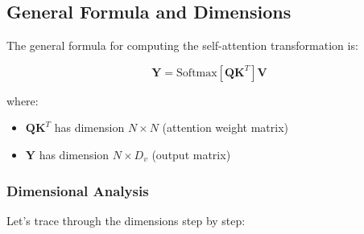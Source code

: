 \documentclass[11pt,a4paper]{article}
\theoremstyle{definition}
\theoremstyle{plain}
\theoremstyle{remark}
\begin{document}
\subsection{General Formula and Dimensions}

\begin{tcolorbox}[colback=blue!10!white,colframe=blue!75!black,title=\textbf{General Self-Attention Formula}]
The general formula for computing the self-attention transformation is:

\[
\mathbf{Y} = \text{Softmax}[\mathbf{Q}\mathbf{K}^T]\mathbf{V}
\]

where:
\begin{itemize}
    \item $\mathbf{Q}\mathbf{K}^T$ has dimension $N \times N$ (attention weight matrix)
    \item $\mathbf{Y}$ has dimension $N \times D_v$ (output matrix)
\end{itemize}
\end{tcolorbox}

\subsubsection{Dimensional Analysis}

Let's trace through the dimensions step by step:
\end{document}
